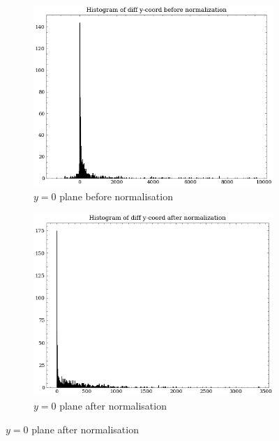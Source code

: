 \begin{figure}[H]
\vspace{1cm}
    \begin{subfigure}[b]{0.45\textwidth}
        \centering
        \includegraphics[width=\textwidth]{assets/preprocessing/Histogram_of_diff_y-coord_before_normalization.png}
        \caption{$y=0$ plane before normalisation}
        \label{fig:resampling-flipping-y-before}
    \end{subfigure}
    \hfill
    \begin{subfigure}[b]{0.45\textwidth}
        \centering
        \includegraphics[width=\textwidth]{assets/preprocessing/Histogram_of_diff_y-coord_after_normalization.png}
        \caption{$y=0$ plane after normalisation}
        \label{fig:resampling-flipping-y-after}
    \end{subfigure}


\end{figure}
